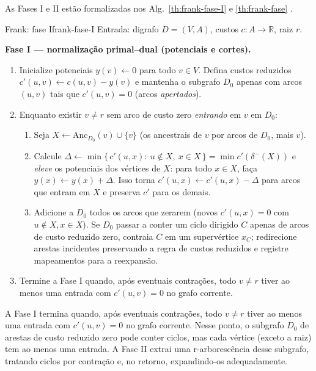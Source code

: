As Fases I e II estão formalizadas nos Alg.\ \ref{th:frank-fase-I} e \ref{th:frank-fase} \cite{frank2014}.



\begin{algobox}{Frank: fase I}{frank-fase-I}
	Entrada: digrafo \(D=(V,A)\), custos \(c:A\to\mathbb{R}\), raiz \(r\).

	\textbf{Fase I — normalização primal–dual (potenciais e cortes).}
	\begin{enumerate}\setlength{\itemsep}{1pt}
		\item Inicialize potenciais \(y(v)\gets 0\) para todo \(v\in V\). Defina custos reduzidos \(c'(u,v)\gets c(u,v)-y(v)\) e mantenha o subgrafo \(D_0\) apenas com arcos \((u,v)\) tais que \(c'(u,v)=0\) (arcos \emph{apertados}).
		\item Enquanto existir \(v\neq r\) sem arco de custo zero \emph{entrando} em \(v\) em \(D_0\):
		      \begin{enumerate}\setlength{\itemsep}{1pt}
			      \item Seja \(X\gets \mathrm{Anc}_{D_0}(v)\cup\{v\}\) (os ancestrais de \(v\) por arcos de \(D_0\), mais \(v\)).
			      \item Calcule \(\Delta\gets\min\{\,c'(u,x):\ u\notin X,\ x\in X\,\}=\min c'(\delta^-(X))\) e \emph{eleve} os potenciais dos vértices de \(X\): para todo \(x\in X\), faça \(y(x)\gets y(x)+\Delta\). Isso torna \(c'(u,x)\gets c'(u,x)-\Delta\) para arcos que entram em \(X\) e preserva \(c'\) para os demais.
			      \item Adicione a \(D_0\) todos os arcos que zerarem (novos \(c'(u,x)=0\) com \(u\notin X, x\in X\)). Se \(D_0\) passar a conter um ciclo dirigido \(C\) apenas de arcos de custo reduzido zero, contraia \(C\) em um supervértice \(x_C\); redirecione arestas incidentes preservando a regra de custos reduzidos e registre mapeamentos para a reexpansão.
		      \end{enumerate}
		\item Termine a Fase I quando, após eventuais contrações, todo \(v\neq r\) tiver ao menos uma entrada com \(c'(u,v)=0\) no grafo corrente.
	\end{enumerate}
\end{algobox}


A Fase I termina quando, após eventuais contrações, todo \(v\neq r\) tiver ao menos uma entrada com \(c'(u,v)=0\) no grafo corrente. Nesse ponto, o subgrafo \(D_0\) de arestas de custo reduzido zero pode conter ciclos, mas cada vértice (exceto a raiz) tem ao menos uma entrada. A Fase II extrai uma r-arborescência desse subgrafo, tratando ciclos por contração e, no retorno, expandindo-os adequadamente.


